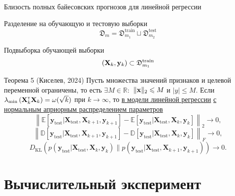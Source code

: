 \documentclass{beamer}
\begin{document}
\begin{frame}{Близость полных байесовских прогнозов для линейной регрессии}
    \vspace{-0.2cm}
    \begin{block}{Разделение на обучающую и тестовую выборки}
        \vspace{-0.3cm}
        \[ \mathfrak{D}_m = \mathfrak{D}_{m_1}^{\text{train}} \sqcup \mathfrak{D}_{m_2}^{\text{test}} \]
        \vspace{-0.6cm}
    \end{block}
    \begin{block}{Подвыборка обучающей выборки}
        \vspace{-0.3cm}
        \[ \left( \mathbf{X}_k, \mathbf{y}_k \right) \subset \mathfrak{D}_{m_1}^{\text{train}} \]
        \vspace{-0.6cm}
    \end{block}
    \begin{block}{Теорема 5 (Киселев, 2024)}
        Пусть множества значений признаков и целевой переменной ограничены, то есть $\exists M \in \mathbb{R}:$ $\| \mathbf{x} \|_2 \leqslant M$ и $|y| \leqslant M$. Если  $\lambda_{\min}\left( \mathbf{X}^{\text{\tiny\sffamily\upshape\mdseries T}}_k \mathbf{X}_k \right) = \omega(\sqrt{k})$ при $k \to \infty$, то \underline{в модели линейной регрессии} \underline{с нормальным априорным распределением параметров}\\
        \vspace{-0.3cm}
        \[ \left\|\mathbb{E}\left[ \mathbf{y}_{\mathrm{test}}|\mathbf{X_{\mathrm{test}}}, \mathbf{X}_{k+1}, \mathbf{y}_{k+1} \right] - \mathbb{E}\left[ \mathbf{y}_{\mathrm{test}}|\mathbf{X_{\mathrm{test}}}, \mathbf{X}_{k}, \mathbf{y}_{k} \right]\right\|_2 \to 0, \]
        \[ \left\|\mathbb{D}\left[ \mathbf{y}_{\mathrm{test}}|\mathbf{X_{\mathrm{test}}}, \mathbf{X}_{k+1}, \mathbf{y}_{k+1} \right] - \mathbb{D}\left[ \mathbf{y}_{\mathrm{test}}|\mathbf{X_{\mathrm{test}}}, \mathbf{X}_{k}, \mathbf{y}_{k} \right]\right\|_F \to 0, \]
        \[ D_{\mathrm{KL}}\left(p(\mathbf{y}_{\mathrm{test}}|\mathbf{X_{\mathrm{test}}}, \mathbf{X}_k, \mathbf{y}_k) \| p(\mathbf{y}_{\mathrm{test}}|\mathbf{X_{\mathrm{test}}}, \mathbf{X}_{k+1}, \mathbf{y}_{k+1})\right) \to 0.  \]
    \end{block}
\end{frame}

\section{Вычислительный эксперимент}
\end{document}
